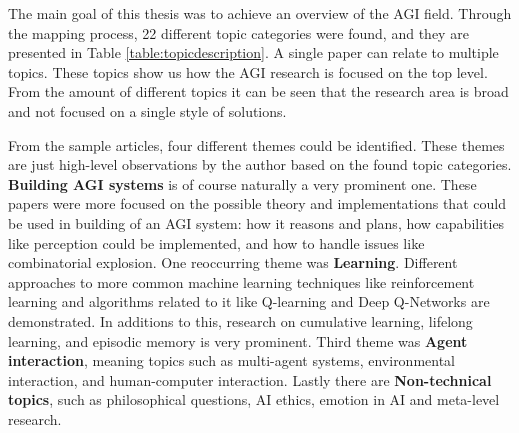 \documentclass[utf8,english]{gradu3}
\begin{document}
The main goal of this thesis was to achieve an overview of the AGI field.
Through the mapping process, 22 different topic categories were found, and they
are presented in Table \ref{table:topicdescription}. A single paper can relate
to multiple topics. These topics show us how the AGI research is focused on the
top level. From the amount of different topics it can be seen that the research
area is broad and not focused on a single style of solutions. 

From the sample articles, four different themes could be identified. These
themes are just high-level observations by the author based on the found topic
categories. \textbf{Building AGI systems} is of course naturally a very
prominent one. These papers were more focused on the possible theory and
implementations that could be used in building of an AGI system: how it reasons
and plans, how capabilities like perception could be implemented, and how to
handle issues like combinatorial explosion. One reoccurring theme was
\textbf{Learning}. Different approaches to more common machine learning
techniques like reinforcement learning and algorithms related to it like
Q-learning and Deep Q-Networks are demonstrated. In additions to this, research
on cumulative learning, lifelong learning, and episodic memory is very
prominent. Third theme was \textbf{Agent interaction}, meaning topics such as
multi-agent systems, environmental interaction, and human-computer interaction.
Lastly there are \textbf{Non-technical topics}, such as philosophical
questions, AI ethics, emotion in AI and meta-level research.
\end{document}
